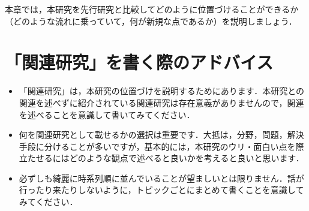 本章では，本研究を先行研究と比較してどのように位置づけることができるか
（どのような流れに乗っていて，何が新規な点であるか）を説明しましょう．

\section{「関連研究」を書く際のアドバイス}
\begin{itemize}
    \item 「関連研究」は，本研究の位置づけを説明するためにあります．本研究との関連を述べずに紹介されている関連研究は存在意義がありませんので，関連を述べることを意識して書いてみてください．
    \item 何を関連研究として載せるかの選択は重要です．大抵は，分野，問題，解決手段に分けることが多いですが，基本的には，本研究のウリ・面白い点を際立たせるにはどのような観点で述べると良いかを考えると良いと思います．
    \item 必ずしも綺麗に時系列順に並んでいることが望ましいとは限りません．話が行ったり来たりしないように，トピックごとにまとめて書くことを意識してみてください．
\end{itemize}
